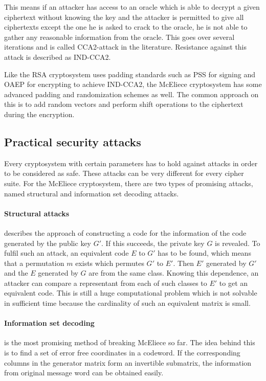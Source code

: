 This means if an attacker has access to an oracle which is able to decrypt a given ciphertext without knowing the key and the attacker is permitted to give all ciphertexts except the one he is asked to crack to the oracle, he is not able to gather any reasonable information from the oracle. This goes over several iterations and is called CCA2-attack in the literature. Resistance against this attack is described as IND-CCA2. 

Like the RSA cryptosystem uses padding standards such as PSS for signing and OAEP for encrypting to achieve IND-CCA2, the McEliece cryptosystem has some advanced padding and randomization schemes as well. The common approach on this is to add  random vectors and perform shift operations to the ciphertext during the encryption\cite{dottling2012cca2}. 

\subsection*{Practical security attacks}
\label{keylength}
Every cryptosystem with certain parameters has to hold against attacks in order to be considered as safe. These attacks can be very different for every cipher suite. 
For the McEliece cryptosystem, there are two types of promising attacks, named structural and information set decoding attacks. 
\paragraph*{Structural attacks} describes the approach of constructing a code for the information of the code generated by the public key $G'$. If this succeeds, the private key $G$ is revealed. 
To fulfil such an attack, an equivalent code $E$ to $G'$ has to be found, which means that a permutation $m$ exists which permutes $G'$ to $E'$. Then $E'$ generated by $G'$ and the $E$ generated by $G$ are from the same class. 
Knowing this dependence, an attacker can compare a representant from each of such classes to $E'$ to get an equivalent code. This is still a huge computational problem which is not solvable in sufficient time because the cardinality of such an equivalent matrix is small. \cite{au2003mceliece}


\paragraph*{Information set decoding} is the most promising method of breaking McEliece so far. The idea behind this is to find a set of error free coordinates in a codeword. If the corresponding columns in the generator matrix form an invertible submatrix, the information from original message word can be obtained easily. 

